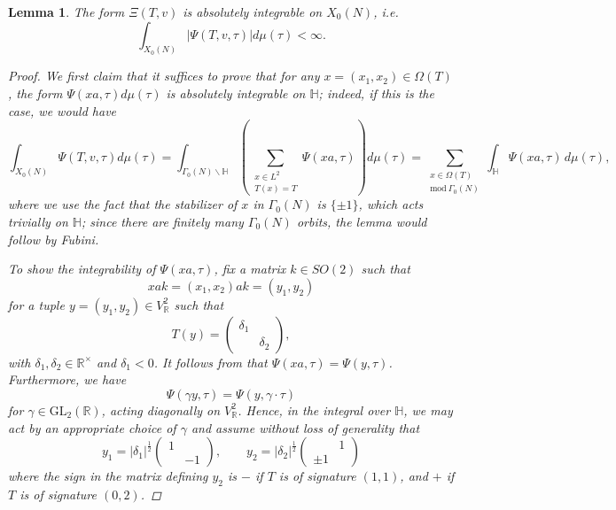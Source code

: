 \documentclass[reqno,oneside]{amsart}
\theoremstyle{plain}
\newtheorem{lemma}[theorem]{Lemma}
\theoremstyle{remark}
\numberwithin{theorem}{section}
\newcommand{\bbH}{\mathbb H}
\newcommand{\bbR}{\mathbb R}
\newcommand{\GL}{\mathrm{GL}}
\begin{document}
	\begin{lemma} The form $\Xi(T,v)$ is absolutely integrable on $X_0(N)$, i.e.\
		\[
		\int_{X_0(N)} | \Psi(T,v,\tau) | d\mu(\tau) < \infty.
		\]
		\begin{proof} We first claim that it suffices to prove that for any $x = (x_1, x_2) \in \Omega(T)$, the form $\Psi(xa, \tau) d\mu(\tau)$ is absolutely integrable on $\mathbb H$; indeed, if this is the case, we would have
			\begin{equation} \label{eq:Psi}
			\int_{X_0(N)} \Psi(T,v,\tau) d \mu(\tau) = \int_{\Gamma_0(N)\backslash \bbH} \left( \sum_{\substack{ x \in L^2 \\ T(x) = T}}  \Psi(xa, \tau) \right) d\mu(\tau) = \sum_{\substack{x \in \Omega(T) \\ \text{mod} \ \Gamma_0(N)} }  \int_{\bbH} \Psi(xa, \tau) \, d \mu(\tau),
			\end{equation}
			where we use the fact that the stabilizer of $x$ in $\Gamma_0(N)$ is $\{\pm 1\}$, which acts trivially on $\bbH$; since there are finitely many $\Gamma_0(N)$ orbits, the lemma would follow by Fubini.
			
			To show the integrability of $\Psi(xa, \tau)$, fix a matrix $k \in SO(2)$ such that
			\begin{equation}
			x a k = (x_1,x_2) a k = (y_1, y_2)
			\end{equation}
			for a tuple $y = (y_1, y_2) \in V_{\bbR}^2$ such that
			\begin{equation}
			T(y) = \begin{pmatrix} \delta_1 & \\ & \delta_2 \end{pmatrix},
			\end{equation}
			with $\delta_1, \delta_2 \in \bbR^{\times}$ and $\delta_1 < 0$. It follows from \cite{GarciaSankaran} that $\Psi(xa, \tau) = \Psi(y, \tau)$. Furthermore, we have
			\begin{equation}
			\Psi(\gamma y, \tau) = \Psi(y, \gamma \cdot \tau)
			\end{equation}
			for $\gamma \in \GL_2(\bbR)$, acting diagonally on $V_{\bbR}^2$. Hence, in the integral over $\bbH$, we may act by an appropriate choice of $\gamma$ and assume without loss of generality that
			\begin{equation}
			y_1 = |\delta_1|^{\frac12} \begin{pmatrix} 1 & \\ & -1 \end{pmatrix}, \qquad y_2 =|\delta_2|^{\frac12} \begin{pmatrix} & 1 \\ \pm 1 & \end{pmatrix}
			\end{equation}
			where the sign in the matrix defining $y_2$ is $-$ if $T$ is of signature $(1,1)$, and $+$ if $T$ is of signature $(0,2)$.
			

\end{proof}
\end{lemma}
\end{document}

